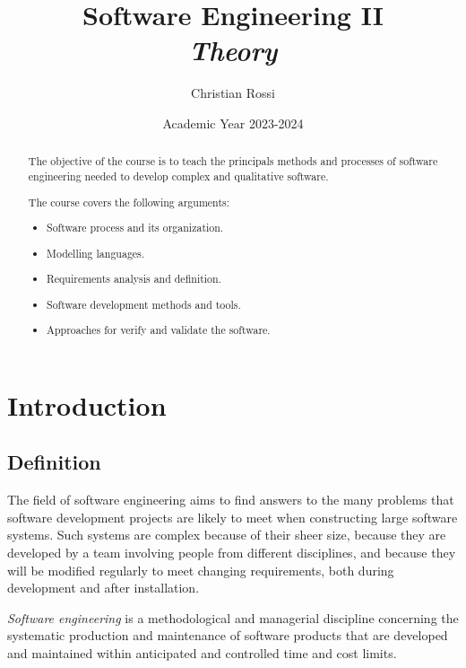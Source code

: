 \documentclass[12pt, a4paper]{report}
\title{Software Engineering II \\ \textit{Theory}}
\author{Christian Rossi}
\date{Academic Year 2023-2024}
\newtheorem[style=M,bodystyle=\normalfont]{theorem}{Theorem}
\newtheorem[style=M,bodystyle=\normalfont]{corollary}{Corollary}
\newtheorem[style=M,bodystyle=\normalfont]{lemma}{Lemma}
\newtheorem[style=M,bodystyle=\normalfont]{definition}{Definition}
\begin{document}
\maketitle

\newpage

\begin{abstract}
    The objective of the course is to teach the principals methods and processes of software engineering needed to develop complex and qualitative software.
     
    The course covers the following arguments:
    \begin{itemize}
        \item Software process and its organization.
        \item Modelling languages.
        \item Requirements analysis and definition.
        \item Software development methods and tools.
        \item Approaches for verify and validate the software.
    \end{itemize}
\end{abstract}

\newpage

\tableofcontents

\newpage

\chapter{Introduction}
    \section{Definition}
    The field of software engineering aims to find answers to the many problems that software development projects are likely
    to meet when constructing large software systems. Such systems are complex because of their sheer size, because they are 
    developed by a team involving people from different disciplines, and because they will be modified regularly to meet 
    changing requirements, both during development and after installation. 
    \begin{definition}
        \emph{Software engineering} is a methodological and managerial discipline concerning the systematic production and 
        maintenance of software products that are developed and maintained within anticipated and controlled time and cost limits.
    \end{definition}
    
\end{document}
